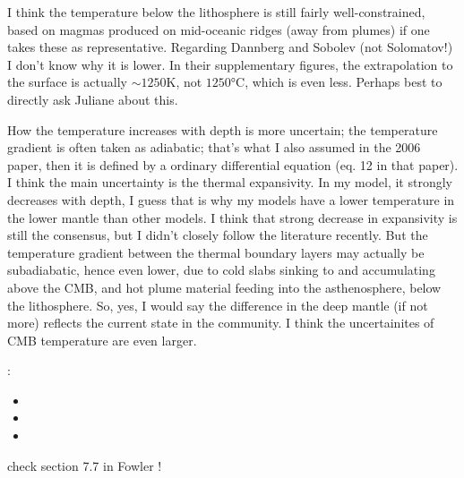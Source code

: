 \begin{displayquote}
I think the temperature below the lithosphere is still fairly well-constrained, 
based on magmas produced on mid-oceanic ridges (away from plumes) if one takes 
these as representative. Regarding Dannberg and Sobolev (not Solomatov!) 
I don't know why it is lower. In their supplementary figures, the extrapolation 
to the surface is actually $\sim 1250\si{\kelvin}$, not $1250\si{\celsius}$, 
which is even less. Perhaps best to directly ask Juliane about this.

How the temperature increases with depth is more uncertain; the temperature 
gradient is often taken as adiabatic; that's what I also assumed in the 2006 
paper, then it is defined by a ordinary differential equation (eq. 12 in that paper). 
I think the main uncertainty is the thermal expansivity. In my model, it strongly 
decreases with depth, I guess that is why my models have a lower temperature in 
the lower mantle than other models. I think that strong decrease in expansivity 
is still the consensus, but I didn't closely follow the literature recently. 
But the temperature gradient between the thermal boundary layers may actually 
be subadiabatic, hence even lower, due to cold slabs sinking to and accumulating 
above the CMB, and hot plume material feeding into the asthenosphere, below the 
lithosphere. So, yes, I would say the difference in the deep mantle (if not more) 
reflects the current state in the community.
I think the uncertainites of CMB temperature are even larger. 
\end{displayquote}



\Literature: 
\begin{itemize}
\item {}
\item {}
\item {}
\end{itemize}


check section 7.7 in Fowler !


